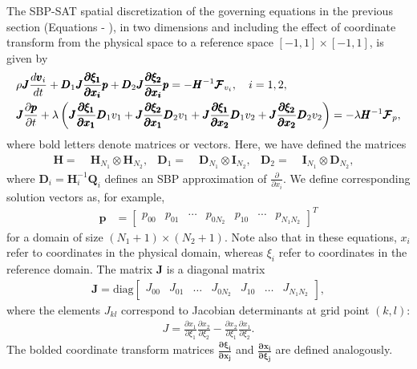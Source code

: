 The SBP-SAT spatial discretization of the governing equations in the previous section
(Equations  - ), in two dimensions and including the
effect of coordinate transform from the physical space to a reference space
$[-1,1]\times[-1,1]$, is given by
\begin{align}
	&\rho \pmb{J} \frac{d \pmb{v}_{i}}{dt}
	+ \pmb{D}_{1} \pmb{J} \frac{ \pmb{\partial \xi_{1}}}{\pmb{\partial x_{i}}} \pmb{p}
	+ \pmb{D}_{2} \pmb{J}\frac{\pmb{\partial \xi_{2}}}{\pmb{\partial x_{i}}} \pmb{p} =
	- \pmb{{H}}^{-1}\pmb{\mathcal{F}}_{v_{i}}, \quad i=1,2,\\
	&\pmb{J}\frac{\partial \pmb{p}}{\partial t} +\lambda\left(
	\pmb{J}\frac{\pmb{\partial \xi_{1}}}{\pmb{\partial x_{1}}} \pmb{D}_{1} v_{1}
	+ \pmb{J}\frac{\pmb{\partial \xi_{2}}}{\pmb{\partial x_{1}}} \pmb{D}_{2} v_{1}
	+ \pmb{J}\frac{\pmb{\partial \xi_{1}}}{\pmb{\partial x_{2}}} \pmb{D}_{1} v_{2}
	+ \pmb{J}\frac{\pmb{\partial \xi_{2}}}{\pmb{\partial x_{2}}} \pmb{D}_{2} v_{2}
  \right)
  =
	-\lambda \pmb{H}^{-1} \pmb{\mathcal{F}}_{p},
\end{align}
where bold letters denote matrices or vectors. Here, we have defined the matrices
\begin{align}
	\pmb{H}     =\;& \pmb{H}_{N_{1}}\otimes \pmb{H}_{N_{2}},&
	\pmb{D}_{1} =\;& \pmb{D}_{N_{1}}\otimes \pmb{I}_{N_{2}},&
	\pmb{D}_{2} =\;& \pmb{I}_{N_{1}}\otimes \pmb{D}_{N_{2}},&
\end{align}
where $\pmb{D}_{i} = \pmb{H}_{i}^{-1}\pmb{Q}_{i}$ defines an SBP approximation of $\frac{\partial}{\partial x_{i}}$.
We define corresponding solution vectors as, for example,
\begin{align}
  \pmb{p} &=
  \begin{bmatrix}
    p_{00} & p_{01} & \cdots & p_{0N_{2}} & p_{10} & \cdots & p_{N_{1}N_{2}}
  \end{bmatrix}^{T}
\end{align}
for a domain of size $(N_{1}+1) \times (N_{2}+1)$.
Note also that in these equations, $x_{i}$ refer to coordinates in the physical domain,
whereas $\xi_{i}$ refer to coordinates in the reference domain. The matrix $\pmb{J}$ is
a diagonal matrix
\begin{align}
  \pmb{J} = \text{diag}
  \begin{bmatrix}
	  J_{00} & J_{01} & \hdots & J_{0N_{2}} & J_{10} & \hdots & J_{N_{1}N_{2}} \label{eq:sbp_jac}
  \end{bmatrix},
\end{align}
where the elements $J_{kl}$ correspond to Jacobian determinants at grid point $(k,l)$:
\begin{align}
J = \frac{\partial x_{1}}{\partial \xi_{1}} \frac{\partial x_{2}}{\partial \xi_{2}} -
    \frac{\partial x_{2}}{\partial \xi_{1}} \frac{\partial x_{1}}{\partial \xi_{2}}.
\end{align}
The bolded coordinate transform matrices $\frac{\pmb{\partial \xi_{i}}}{\pmb{\partial x_{j}}}$
and $\frac{\pmb{\partial x_{i}}}{\pmb{\partial \xi_{j}}}$ are defined analogously.

